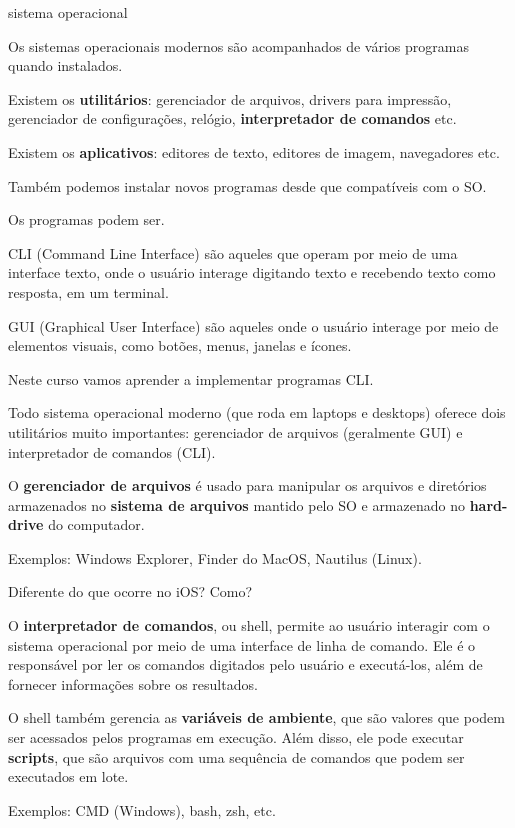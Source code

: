\documentclass{beamer}
\begin{document}
\begin{frame}[allowframebreaks]{sistema operacional}

  Os sistemas operacionais modernos são acompanhados de vários
  programas quando instalados.

  Existem os \textbf{utilitários}: gerenciador de arquivos, drivers
  para impressão, gerenciador de configurações, relógio,
  \textbf{interpretador de comandos} etc.

  Existem os \textbf{aplicativos}: editores de texto, editores de
  imagem, navegadores etc.

  Também podemos instalar novos programas desde que compatíveis com o
  SO.

  \framebreak

  Os programas podem ser.

  CLI (Command Line Interface) são aqueles que operam por meio de uma
  interface texto, onde o usuário interage digitando texto e recebendo
  texto como resposta, em um terminal. 

  GUI (Graphical User Interface) são aqueles onde o usuário interage
  por meio de elementos visuais, como botões, menus, janelas e ícones.

  Neste curso vamos aprender a implementar programas CLI.

  \framebreak

  Todo sistema operacional moderno (que roda em laptops e desktops)
  oferece dois utilitários muito importantes: gerenciador de arquivos
  (geralmente GUI) e interpretador de comandos (CLI).

  \framebreak

  O \textbf{gerenciador de arquivos} é usado para manipular os
  arquivos e diretórios armazenados no \textbf{sistema de arquivos}
  mantido pelo SO e armazenado no \textbf{hard-drive} do computador.

  Exemplos: Windows Explorer, Finder do MacOS, Nautilus (Linux).

  Diferente do que ocorre no iOS? Como?

  \framebreak

  O \textbf{interpretador de comandos}, ou shell, permite ao usuário
  interagir com o sistema operacional por meio de uma interface de
  linha de comando. Ele é o responsável por ler os comandos digitados
  pelo usuário e executá-los, além de fornecer informações sobre os
  resultados.

  O shell também gerencia as \textbf{variáveis de ambiente}, que são
  valores que podem ser acessados pelos programas em execução. Além
  disso, ele pode executar \textbf{scripts}, que são arquivos com uma
  sequência de comandos que podem ser executados em lote.

  Exemplos: CMD (Windows), bash, zsh, etc.

\end{frame}
\end{document}
